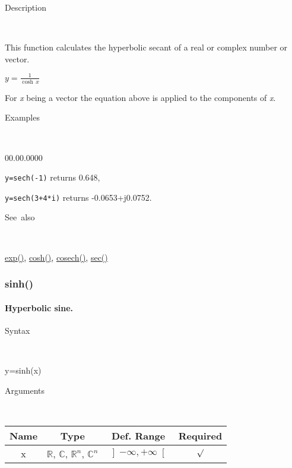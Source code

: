 \begin{description}
\item [Description]~
\end{description}
This function calculates the hyperbolic secant of a real or complex
number or vector.

\medskip{}
$y={\displaystyle \frac{1}{\cosh\, x}}$ 
\medskip{}

For \textit{x} being a vector the equation above is applied
to the components of \textit{x}.

\begin{description}
\item [Examples]~
\end{description}
\begin{lyxlist}{00.00.0000}
\item [\texttt{y=sech(-1)}]returns 0.648,
\item [\texttt{y=sech(3+4{*}i)}]returns -0.0653+j0.0752.
\end{lyxlist}
\begin{description}
\item [See~also]~
\end{description}
\textcolor{blue}{\hyperlink{exp}{exp()}}\textcolor{black}{,} \textcolor{blue}{\hyperlink{cosh}{cosh()}}\textcolor{black}{,}
\textcolor{blue}{\hyperlink{cosech}{cosech()}}\textcolor{black}{,}
\textcolor{blue}{\hyperlink{sec}{sec()}}


\newpage
\subsubsection*{\hypertarget{sinh}{}{\Large sinh()}}


\paragraph{\label{par:Hyperbolic-sine}Hyperbolic sine.}

\begin{description}
\item [Syntax]~
\end{description}
y=sinh(x)

\begin{description}
\item [Arguments]~
\end{description}
\begin{tabular}{|c|c|c|c|}
\hline 
Name&
Type&
Def. Range&
Required\tabularnewline
\hline
\hline 
x&
$\mathbb{R}$, $\mathbb{C}$, $\mathbb{R}^{n}$, $\mathbb{C}^{n}$&
$\left]-\infty,+\infty\right[$&
$\surd$\tabularnewline
\hline
\end{tabular}

